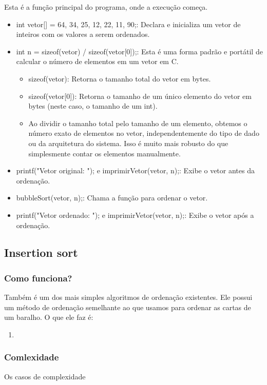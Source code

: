 \documentclass{report}
\begin{document}
\begin{enumerate}
		Esta é a função principal do programa, onde a execução começa.
		
		\begin{itemize}
			\item int vetor[] = {64, 34, 25, 12, 22, 11, 90};: Declara e inicializa um vetor de inteiros com os valores a serem ordenados.
			
			\item int n = sizeof(vetor) / sizeof(vetor[0]);: Esta é uma forma padrão e portátil de calcular o número de elementos em um vetor em C.
			
			\begin{itemize}
				\item sizeof(vetor): Retorna o tamanho total do vetor em bytes.
				\item sizeof(vetor[0]): Retorna o tamanho de um único elemento do vetor em bytes (neste caso, o tamanho de um int).
				\item Ao dividir o tamanho total pelo tamanho de um elemento, obtemos o número exato de elementos no vetor, independentemente do tipo de dado ou da arquitetura do sistema. Isso é muito mais robusto do que simplesmente contar os elementos manualmente.
			\end{itemize}
			\item printf("Vetor original: "); e imprimirVetor(vetor, n);: Exibe o vetor antes da ordenação.
			\item bubbleSort(vetor, n);: Chama a função para ordenar o vetor.
			\item printf("Vetor ordenado: "); e imprimirVetor(vetor, n);: Exibe o vetor após a ordenação.
		\end{itemize}
	\end{enumerate}
	\subsection{Insertion sort}
	\subsubsection{Como funciona?}
	Também é um dos mais simples algoritmos de ordenação existentes. Ele possui um método de ordenação semelhante ao que usamos para
	ordenar as cartas de um baralho. O que ele faz é:
	
	\begin{enumerate}
		\item 
	\end{enumerate}
	
	\subsubsection{Comlexidade}
	Os casos de complexidade
	
\end{document}

